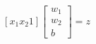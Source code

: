 \documentclass[preview]{standalone}
\begin{document}
\begin{align*}
\left[x_1 x_2 1\right] \begin{bmatrix} w_1 \\ w_2 \\ b \end{bmatrix} = z
\end{align*}
\end{document}
